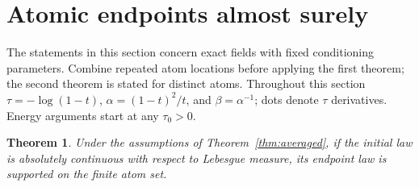 \documentclass[11pt]{article}
\newtheorem{theorem}{Theorem}
\begin{document}
\section{Atomic endpoints almost surely}
The statements in this section concern exact fields with fixed conditioning
parameters. Combine repeated atom locations before applying the first theorem;
the second theorem is stated for distinct atoms. Throughout this section
$\tau=-\log(1-t)$, $\alpha=(1-t)^2/t$, and $\beta=\alpha^{-1}$; dots denote
$\tau$ derivatives. Energy arguments start at any $\tau_0>0$.
\begin{theorem}\label{thm:average-as}
Under the assumptions of Theorem~\ref{thm:averaged}, if the initial law is
absolutely continuous with respect to Lebesgue measure, its endpoint law is
supported on the finite atom set.
\end{theorem}
\end{document}
